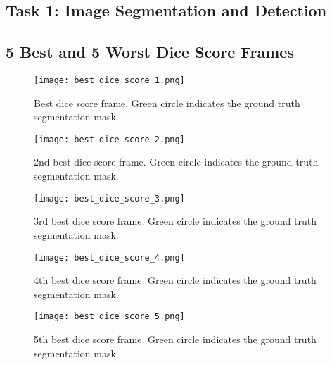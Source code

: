 \documentclass{report}
\begin{document}
\begin{appendices}

\chapter{Task 1: Image Segmentation and Detection}\label{sec:app_task1}

\section{5 Best and 5 Worst Dice Score Frames}

\begin{figure}
    \centering
    \texttt{[image: best\_dice\_score\_1.png]}
    \caption{Best dice score frame. Green circle indicates the ground truth segmentation mask.}
\end{figure}
\begin{figure}
    \centering
    \texttt{[image: best\_dice\_score\_2.png]}
    \caption{2nd best dice score frame. Green circle indicates the ground truth segmentation mask.}
\end{figure}
\begin{figure}
    \centering
    \texttt{[image: best\_dice\_score\_3.png]}
    \caption{3rd best dice score frame. Green circle indicates the ground truth segmentation mask.}
\end{figure}
\begin{figure}
    \centering
    \texttt{[image: best\_dice\_score\_4.png]}
    \caption{4th best dice score frame. Green circle indicates the ground truth segmentation mask.}
\end{figure}
\begin{figure}
    \centering
    \texttt{[image: best\_dice\_score\_5.png]}
    \caption{5th best dice score frame. Green circle indicates the ground truth segmentation mask.}
\end{figure}


\end{appendices}
\end{document}
